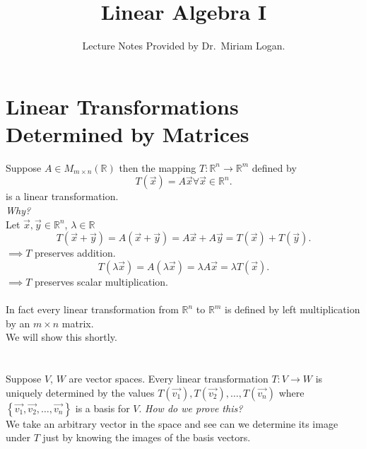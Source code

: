 \documentclass{report}
\begin{document}
\title{Linear Algebra I}
\author{Lecture Notes Provided by Dr.~Miriam Logan.}
\date{}
\maketitle
\tableofcontents
\newpage  
\section{Linear Transformations Determined by Matrices}
 Suppose $ A \in M _{ m \times  n}\left(  \mathbb{R}\right) $                                                 then the mapping $ T: \mathbb{R} ^{n} \to \mathbb{R} ^{m}$ defined by 
 \[
 T \left( \vec{ x}  \right) = A \vec{ x} \forall  \vec{ x} \in \mathbb{R} ^{n}
 .\]                    is a linear transformation.\\
 \textit{Why?} \\
 Let $ \vec{ x} , \vec{ y}  \in \mathbb{R}^{n} $, $ \lambda \in \mathbb{R}$
 \[
 T \left( \vec{ x} + \vec{ y}  \right) = A \left( \vec{ x} + \vec{ y}  \right) = A \vec{ x} + A \vec{ y} = T \left( \vec{ x}  \right) + T \left( \vec{ y}  \right)
 .\] 
 $ \implies T$ preserves addition.\\
 \[
 T \left( \lambda \vec{ x}  \right) = A \left( \lambda \vec{ x}  \right) = \lambda A \vec{ x} = \lambda T \left( \vec{ x}  \right)
 .\] 
 $ \implies T$ preserves scalar multiplication.\\
 \\
 In fact every linear transformation from $ \mathbb{R} ^{n}$ to $ \mathbb{R} ^{m}$ is defined by left multiplication by an $ m \times n$ matrix.\\
 We will show this shortly.\\
 \\
 \\
 \thm{}
 {
	 Suppose $ V$, $ W$ are vector spaces. Every linear transformation $ T: V \to W$ is uniquely determined by the values $ T \left(  \vec{ v_1}  \right) , T \left( \vec{ v_2}  \right) , \ldots , T \left( \vec{ v_n}  \right) $ where $ \left\{ \vec{ v_1} ,\vec{ v_2} ,\ldots , \vec{ v_n}  \right\}$ is a basis for $ V$.
 }
  \textit{How do we prove this?} \\
  We take an arbitrary vector in the space and see can we determine its image under $ T$ just by knowing the images of the basis vectors.\\
  \\
\end{document}

